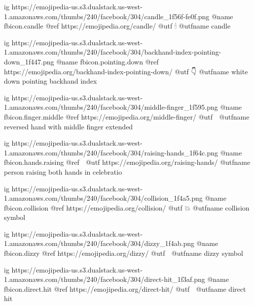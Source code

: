 	ig https://emojipedia-us.s3.dualstack.us-west-1.amazonaws.com/thumbs/240/facebook/304/candle_1f56f-fe0f.png
	@name fbicon.candle
	@ref https://emojipedia.org/candle/
	@utf 🕯
	@utfname candle

	ig https://emojipedia-us.s3.dualstack.us-west-1.amazonaws.com/thumbs/240/facebook/304/backhand-index-pointing-down_1f447.png
	@name fbicon.pointing.down
	@ref https://emojipedia.org/backhand-index-pointing-down/
	@utf 👇
	@utfname white down pointing backhand index

	ig https://emojipedia-us.s3.dualstack.us-west-1.amazonaws.com/thumbs/240/facebook/304/middle-finger_1f595.png
	@name fbicon.finger.middle
	@ref https://emojipedia.org/middle-finger/
	@utf 🖕
	@utfname reversed hand with middle finger extended

	ig https://emojipedia-us.s3.dualstack.us-west-1.amazonaws.com/thumbs/240/facebook/304/raising-hands_1f64c.png
	@name fbicon.hands.raising
	@ref 🙌
	@utf https://emojipedia.org/raising-hands/
	@utfname person raising both hands in celebratio

	ig https://emojipedia-us.s3.dualstack.us-west-1.amazonaws.com/thumbs/240/facebook/304/collision_1f4a5.png
	@name fbicon.collision
	@ref https://emojipedia.org/collision/
	@utf 💥
	@utfname collision symbol

	ig https://emojipedia-us.s3.dualstack.us-west-1.amazonaws.com/thumbs/240/facebook/304/dizzy_1f4ab.png
	@name fbicon.dizzy
	@ref https://emojipedia.org/dizzy/
	@utf 💫
	@utfname dizzy symbol

	ig https://emojipedia-us.s3.dualstack.us-west-1.amazonaws.com/thumbs/240/facebook/304/direct-hit_1f3af.png
	@name fbicon.direct.hit
	@ref https://emojipedia.org/direct-hit/
	@utf 🎯
	@utfname direct hit

\fi

